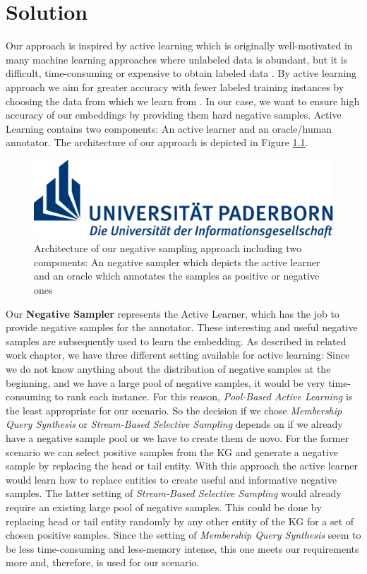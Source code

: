 \chapter{Solution}
\label{ch:solution}

Our approach is inspired by active learning which is originally well-motivated in many machine learning approaches where unlabeled data is abundant, but it is difficult, time-consuming or expensive to obtain labeled data \cite{Settles2009ActiveLL}.
By active learning approach we aim for greater accuracy with fewer labeled training instances by choosing the data from which we learn from \cite{Settles2009ActiveLL}.
In our case, we want to ensure high accuracy of our embeddings by providing them hard negative samples.
Active Learning contains two components: 
An active learner and an oracle/human annotator.
The architecture of our approach is depicted in Figure \ref{fig:architecture}.
\begin{figure}
    \centering
    \includegraphics{figures/uni-logo.pdf}
    \caption{Architecture of our negative sampling approach including two components: An negative sampler which depicts the active learner and an oracle which annotates the samples as positive or negative ones}
    \label{fig:architecture}
\end{figure}

Our \textbf{Negative Sampler} represents the Active Learner, which has the job to provide negative samples for the annotator.
These interesting and useful negative samples are subsequently used to learn the embedding.
As described in related work chapter, we have three different setting available for active learning:
Since we do not know anything about the distribution of negative samples at the beginning, and we have a large pool of negative samples, it would be very time-consuming to rank each instance.
For this reason, \textit{Pool-Based Active Learning} is the least appropriate for our scenario.
So the decision if we chose \textit{Membership Query Synthesis} or \textit{Stream-Based Selective Sampling} depends on if we already have a negative sample pool or we have to create them de novo.
For the former scenario we can select positive samples from the \ac{KG} and generate a negative sample by replacing the head or tail entity.
With this approach the active learner would learn how to replace entities to create useful and informative negative samples.
The latter setting of \textit{Stream-Based Selective Sampling} would already require an existing large pool of negative samples.
This could be done by replacing head or tail entity randomly by any other entity of the \ac{KG} for a set of chosen positive samples.
Since the setting of \textit{Membership Query Synthesis} seem to be less time-consuming and less-memory intense, this one meets our requirements more and, therefore, is used for our scenario.

